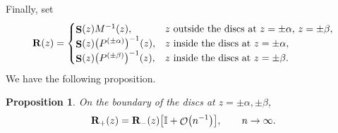 \documentclass[10pt,a4paper]{amsart}
\DeclareMathOperator{\OO}{\mathcal{O}}
\DeclareMathOperator{\boldS}{{\bf S}}
\numberwithin{equation}{section}
\newtheorem{Proposition}[Theorem]{Proposition}
 { \theoremstyle{definition}
\newtheorem{Definition}[Theorem]{Definition}
\newtheorem{Note}[Theorem]{Note}
\newtheorem{Example}[Theorem]{Example}
\newtheorem{Remark}[Theorem]{Remark} }
\begin{document}
Finally, set
 \begin{equation*}
 {\bf R}(z) =
 \begin{cases}
 \boldS(z) M^{-1}(z), & \text{$z$ outside the discs at $z=\pm\alpha$, $z=\pm\beta$},\\
 \boldS(z) \bigl(P^{(\pm\alpha)} \bigr)^{-1}(z), & \text{$z$ inside the discs at $z=\pm\alpha$},\\
 \boldS(z) \bigl(P^{(\pm\beta)} \bigr)^{-1}(z), & \text{$z$ inside the discs at $z=\pm\beta$}.
 \end{cases}
 \end{equation*}
We have the following proposition.

\begin{Proposition}
 On the boundary of the discs at $z=\pm\alpha,\pm\beta$,
 \begin{equation*}
 {\bf R}_+(z) = {\bf R}_-(z) \bigl[\mathbb{I} + \OO \bigl(n^{-1}\bigr) \bigr], \qquad n\to\infty.
 \end{equation*}
\end{Proposition}
\end{document}
